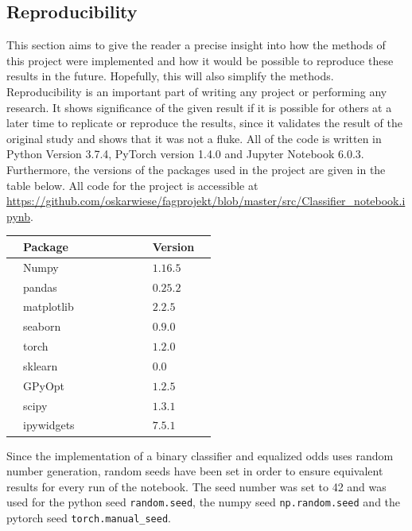 \documentclass[11pt, fleqn, titlepage]{article}
\begin{document}
	\subsection{Reproducibility}
	This section aims to give the reader a precise insight into how the methods of this project were implemented and how it would be possible to reproduce these results in the future. Hopefully, this will also simplify the methods. Reproducibility is an important part of writing any project or performing any research. It shows significance of the given result if it is possible for others at a later time to replicate or reproduce the results, since it validates the result of the original study and shows that it was not a fluke. All of the code is written in Python Version 3.7.4, PyTorch version 1.4.0 and Jupyter Notebook 6.0.3. Furthermore, the versions of the packages used in the project are given in the table below. All code for the project is accessible at \url{https://github.com/oskarwiese/fagprojekt/blob/master/src/Classifier_notebook.ipynb}.
	\begin{table}[]
		\begin{center}
			\begin{tabular}{l l l l l l l l l l}
				\toprule
				& Package      & & & & & & & Version  & \\ \midrule
				& Numpy        & & & & & & & $1.16.5$ & \\
				& pandas       & & & & & & & $0.25.2$ & \\
				& matplotlib   & & & & & & & $2.2.5$  & \\
				& seaborn      & & & & & & & $0.9.0$  & \\
				& torch        & & & & & & & $1.2.0$  & \\
				& sklearn      & & & & & & & $0.0$    & \\
				& GPyOpt       & & & & & & & $1.2.5$  & \\
				& scipy        & & & & & & & $1.3.1$  & \\
				& ipywidgets   & & & & & & & $7.5.1$  & \\ \bottomrule
			\end{tabular}
		\end{center}
	\end{table}
	Since the implementation of a binary classifier and equalized odds uses random number generation, random seeds have been set in order to ensure equivalent results for every run of the notebook. The seed number was set to 42 and was used for the python seed \texttt{random.seed}, the numpy seed \texttt{np.random.seed} and the pytorch seed \texttt{torch.manual\_seed}. \\\\
\end{document}

